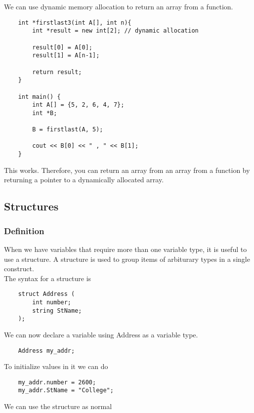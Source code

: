 \documentclass[]{article}
\begin{document}
We can use dynamic memory allocation to return an array from a function.

\begin{lstlisting}
	int *firstlast3(int A[], int n){
		int *result = new int[2]; // dynamic allocation
		
		result[0] = A[0];
		result[1] = A[n-1];
		
		return result;
	}
	
	int main() {
		int A[] = {5, 2, 6, 4, 7};
		int *B;
		
		B = firstlast(A, 5);
		
		cout << B[0] << " , " << B[1];
	}
\end{lstlisting}\bigbreak

This works. Therefore, you can return an array from an array from a function by returning a pointer to a dynamically allocated array. \\


\subsection{Structures}
\bigbreak

\subsubsection{Definition}

When we have variables that require more than one variable type, it is useful to use a structure. A structure is used to group items of arbiturary types in a single construct.\\

The syntax for a structure is

\begin{lstlisting}
	struct Address (
		int number;
		string StName;
	);
\end{lstlisting}\bigbreak

We can now declare a variable using Address as a variable type.

\begin{lstlisting}
	Address my_addr;
\end{lstlisting}\bigbreak

To initialize values in it we can do

\begin{lstlisting}
	my_addr.number = 2600;
	my_addr.StName = "College";
\end{lstlisting}\bigbreak

We can use the structure as normal
\end{document}

